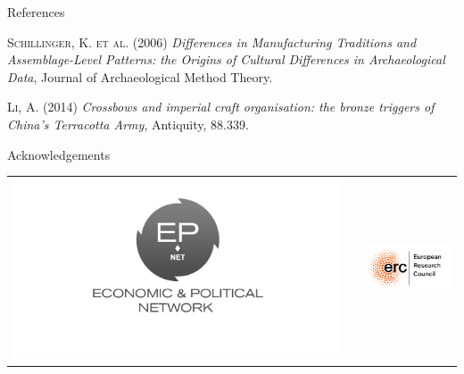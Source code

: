 \documentclass[final]{beamer}
\newlength{\onecolwid}
\begin{document}
\begin{frame}[t]
\begin{columns}[t]
\begin{column}{\onecolwid}
\begin{block}{References}
\begin{thebibliography}{50}
\textsc{Schillinger, K. et al. (2006)}
\textit{Differences in Manufacturing Traditions and Assemblage-Level Patterns: the Origins of Cultural Differences in Archaeological Data}, Journal of Archaeological Method Theory.

\textsc{Li, A. (2014)}
\textit{Crossbows and imperial craft organisation: the bronze triggers of China's Terracotta Army}, Antiquity, 88.339.

\end{thebibliography}

\end{block}



\begin{block}{Acknowledgements}

\small{}

\end{block}




\begin{center}
\begin{tabular}{ccc}
\includegraphics[width=0.4\linewidth]{images/epnet.png} & \hfill & \includegraphics[width=0.4\linewidth]{images/erc.png}
\end{tabular}
\end{center}


\end{column}
\end{columns}
\end{frame}
\end{document}
